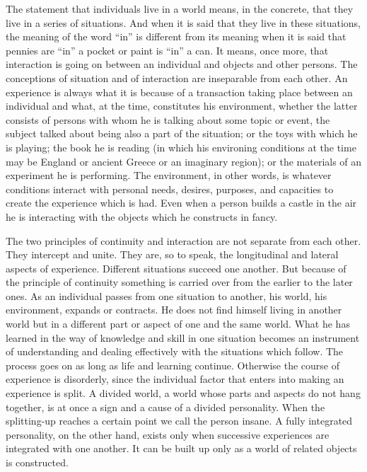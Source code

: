 The statement that individuals live in a world means, in the concrete, that they live in 
a series of situations. And when it is said that they live in these situations, the meaning of 
the word \enquote{in} is different from its meaning when it is said that pennies are \enquote{in} a pocket 
or paint is \enquote{in} a can. It means, once more, that interaction is going on between an 
individual and objects and other persons. The conceptions of situation and of interaction 
are inseparable from each other. An experience is always what it is because of a 
transaction taking place between an individual and what, at the time, constitutes his 
environment, whether the latter consists of persons with whom he is talking about some 
topic or event, the subject talked about being also a part of the situation; or the toys with 
which he is playing; the book he is reading (in which his environing conditions at the 
time may be England or ancient Greece or an imaginary region); or the materials of an 
experiment he is performing. The environment, in other words, is whatever conditions 
interact with personal needs, desires, purposes, and capacities to create the experience 
which is had. Even when a person builds a castle in the air he is interacting with the 
objects which he constructs in fancy. 

The two principles of continuity and interaction are not separate from each other. 
They intercept and unite. They are, so to speak, the longitudinal and lateral aspects of 
experience. Different situations succeed one another. But because of the principle of continuity something is carried over from the earlier to the later ones. As an individual 
passes from one situation to another, his world, his environment, expands or contracts. 
He does not find himself living in another world but in a different part or aspect of one 
and the same world. What he has learned in the way of knowledge and skill in one 
situation becomes an instrument of understanding and dealing effectively with the 
situations which follow. The process goes on as long as life and learning continue. 
Otherwise the course of experience is disorderly, since the individual factor that enters 
into making an experience is split. A divided world, a world whose parts and aspects do 
not hang together, is at once a sign and a cause of a divided personality. When the 
splitting-up reaches a certain point we call the person insane. A fully integrated 
personality, on the other hand, exists only when successive experiences are integrated 
with one another. It can be built up only as a world of related objects is constructed. 

